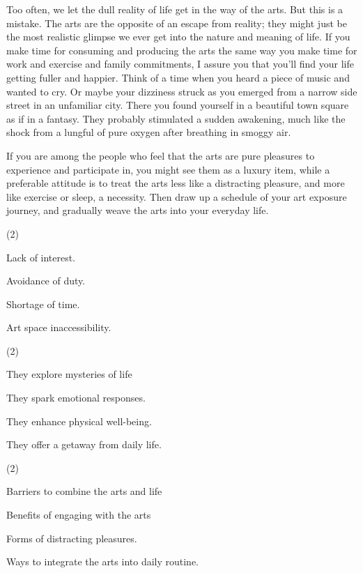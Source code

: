 \documentclass{英语试卷}
\begin{document}
\par Too often, we let the dull reality of life get in the way of the arts. But this is a mistake. The arts are the opposite of an escape from reality; they might just be the most realistic glimpse we ever get into the nature and meaning of life. If you make time for consuming and producing the arts the same way you make time for work and exercise and family commitments, I assure you that you'll find your life getting fuller and happier. Think of a time when you heard a piece of music and wanted to cry. Or maybe your dizziness struck as you emerged from a narrow side street in an unfamiliar city. There you found yourself in a beautiful town square as if in a fantasy. They probably stimulated a sudden awakening, much like the shock from a lungful of pure oxygen after breathing in smoggy air.\par
\par If you are among the people who feel that the arts are pure pleasures to experience and participate in, you might see them as a luxury item, while a preferable attitude is to treat the arts less like a distracting pleasure, and more like exercise or sleep, a necessity. Then draw up a schedule of your art exposure journey, and gradually weave the arts into your everyday life.\par
{}
\begin{choices}(2)
  \item Lack of interest.
  \item Avoidance of duty.
  \item Shortage of time.
  \item Art space inaccessibility.
\end{choices}
\begin{choices}(2)
  \item They explore mysteries of life
  \item They spark emotional responses.
  \item They enhance physical well-being.
  \item They offer a getaway from daily life.
\end{choices}
\begin{choices}(2)
  \item Barriers to combine the arts and life
  \item Benefits of engaging with the arts
  \item Forms of distracting pleasures.
  \item Ways to integrate the arts into daily routine.
\end{choices}
\end{document}
